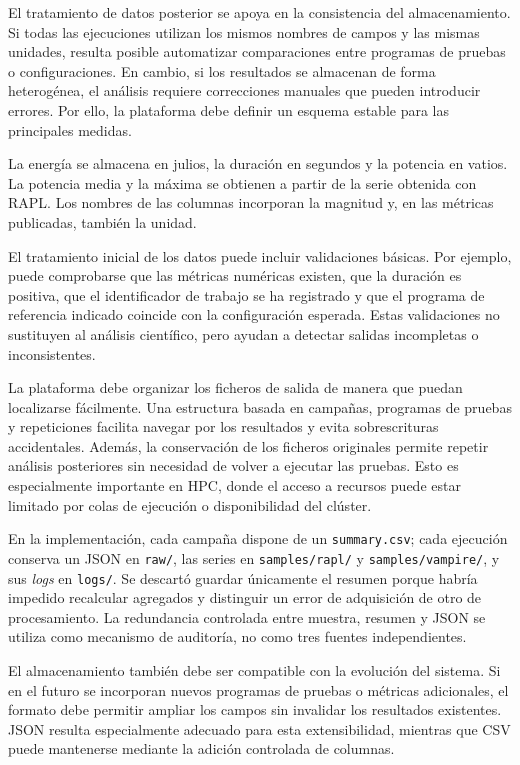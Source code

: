 El tratamiento de datos posterior se apoya en la consistencia del almacenamiento. Si todas las ejecuciones utilizan los mismos nombres de campos y las mismas unidades, resulta posible automatizar comparaciones entre programas de pruebas o configuraciones. En cambio, si los resultados se almacenan de forma heterogénea, el análisis requiere correcciones manuales que pueden introducir errores. Por ello, la plataforma debe definir un esquema estable para las principales medidas.

La energía se almacena en julios, la duración en segundos y la potencia en vatios. La potencia media y la máxima se obtienen a partir de la serie obtenida con RAPL. Los nombres de las columnas incorporan la magnitud y, en las métricas publicadas, también la unidad.

El tratamiento inicial de los datos puede incluir validaciones básicas. Por ejemplo, puede comprobarse que las métricas numéricas existen, que la duración es positiva, que el identificador de trabajo se ha registrado y que el programa de referencia indicado coincide con la configuración esperada. Estas validaciones no sustituyen al análisis científico, pero ayudan a detectar salidas incompletas o inconsistentes.

La plataforma debe organizar los ficheros de salida de manera que puedan localizarse fácilmente. Una estructura basada en campañas, programas de pruebas y repeticiones facilita navegar por los resultados y evita sobrescrituras accidentales. Además, la conservación de los ficheros originales permite repetir análisis posteriores sin necesidad de volver a ejecutar las pruebas. Esto es especialmente importante en HPC, donde el acceso a recursos puede estar limitado por colas de ejecución o disponibilidad del clúster.

En la implementación, cada campaña dispone de un \texttt{summary.csv}; cada ejecución conserva un JSON en \texttt{raw/}, las series en \texttt{samples/rapl/} y \texttt{samples/vampire/}, y sus \emph{logs} en \texttt{logs/}. Se descartó guardar únicamente el resumen porque habría impedido recalcular agregados y distinguir un error de adquisición de otro de procesamiento. La redundancia controlada entre muestra, resumen y JSON se utiliza como mecanismo de auditoría, no como tres fuentes independientes.

El almacenamiento también debe ser compatible con la evolución del sistema. Si en el futuro se incorporan nuevos programas de pruebas o métricas adicionales, el formato debe permitir ampliar los campos sin invalidar los resultados existentes. JSON resulta especialmente adecuado para esta extensibilidad, mientras que CSV puede mantenerse mediante la adición controlada de columnas.

